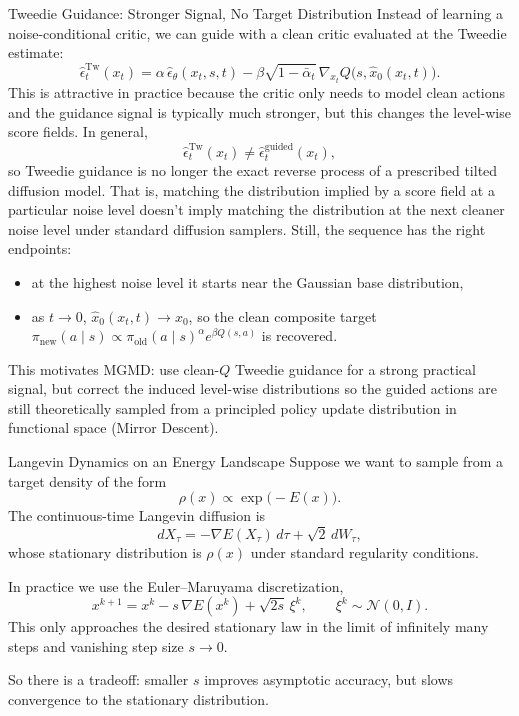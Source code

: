 \documentclass[aspectratio=169,11pt]{beamer}
\begin{document}
\begin{frame}{Tweedie Guidance: Stronger Signal, No Target Distribution}
\small
Instead of learning a noise-conditional critic, we can guide with a clean critic evaluated at the Tweedie estimate:
\[
\hat\epsilon_t^{\mathrm{Tw}}(x_t) = \alpha\,\hat\epsilon_\theta(x_t,s,t) - \beta\sqrt{1-\bar\alpha_t}\,\nabla_{x_t}Q\bigl(s,\hat x_0(x_t,t)\bigr).
\]
This is attractive in practice because the critic only needs to model clean actions and the guidance signal is typically much stronger, but this changes the level-wise score fields. In general,
\[
\hat\epsilon_t^{\mathrm{Tw}}(x_t) \neq \hat\epsilon_t^{\mathrm{guided}}(x_t),
\]
so Tweedie guidance is no longer the exact reverse process of a prescribed tilted diffusion model. That is, matching the distribution implied by a score field at a particular noise level doesn't imply matching the distribution at the next cleaner noise level under standard diffusion samplers. Still, the sequence has the right endpoints:
\begin{itemize}
  \item at the highest noise level it starts near the Gaussian base distribution,
  \item as $t\to 0$, $\hat x_0(x_t,t)\to x_0$, so the clean composite target $\pi_{\mathrm{new}}(a\mid s)\propto \pi_{\mathrm{old}}(a\mid s)^\alpha e^{\beta Q(s,a)}$ is recovered.
\end{itemize}
This motivates MGMD: use clean-$Q$ Tweedie guidance for a strong practical signal, but correct the induced level-wise distributions so the guided actions are still theoretically sampled from a principled policy update distribution in functional space (Mirror Descent).
\end{frame}

\begin{frame}{Langevin Dynamics on an Energy Landscape}
\small
Suppose we want to sample from a target density of the form
\[
\rho(x) \propto \exp\!\bigl(-E(x)\bigr).
\]
The continuous-time Langevin diffusion is
\[
dX_\tau = -\nabla E(X_\tau)\,d\tau + \sqrt{2}\,dW_\tau,
\]
whose stationary distribution is $\rho(x)$ under standard regularity conditions.

\medskip
In practice we use the Euler--Maruyama discretization,
\[
x^{k+1} = x^k - s\,\nabla E(x^k) + \sqrt{2s}\,\xi^k,
\qquad \xi^k\sim\mathcal{N}(0,I).
\]
This only approaches the desired stationary law in the limit of infinitely many steps and vanishing step size $s\to 0$.

\medskip
So there is a tradeoff: smaller $s$ improves asymptotic accuracy, but slows convergence to the stationary distribution.
\end{frame}
\end{document}
